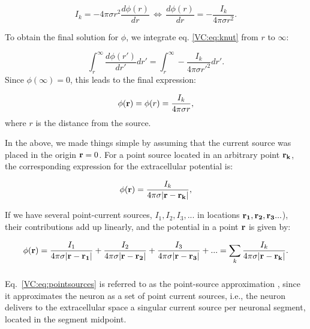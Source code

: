 \begin{equation}
I_k = -4\pi \sigma r^2  \frac{d\phi(r)}{dr} \, \iff \, \frac{d\phi(r)}{dr} = -\frac{I_k}{4\pi \sigma r^2 }.
\label{VC:eq:knut}
\end{equation}

To obtain the final solution for $\phi$, we integrate eq. \ref{VC:eq:knut} from $r$ to $\infty$:

\begin{equation}
\int_r^{\infty} \frac{d\phi(r')}{dr'} dr' = \int_r^{\infty} -\frac{I_k}{4\pi \sigma r'^2 } dr'.
\label{VC:eq:knut2}
\end{equation}
Since $\phi({\infty}) = 0$, this leads to the final expression:

\begin{equation}
\phi({\bf r}) = \phi(r) = \frac{I_k}{4\pi \sigma r},
\label{VC:eq:pointsource}
\end{equation}
where $r$ is the distance from the source.

In the above, we made things simple by assuming that the current source was placed in the origin ${\bf r} = 0$. For a point source located in an arbitrary point ${\bf r_k} $, the corresponding expression for the extracellular potential is:

\begin{equation}
\phi({\bf r}) = \frac{I_k}{4\pi \sigma |{\bf r-r_k}|},
\label{VC:eq:pointsource2}
\end{equation}

If we have several point-current sources, $I_{1}, I_2, I_3, ... $ in locations ${\bf r_1}, {\bf r_2}, {\bf r_3} ... $), their contributions add up linearly, and the potential in a point ${\bf r}$ is given by:

\begin{equation}
\phi({\bf r}) = \frac{I_1}{4\pi  \sigma {\bf |r-r_1|}} + \frac{I_2}{4\pi  \sigma {\bf |r-r_2|} } + \frac{I_3}{4\pi  \sigma {\bf |r-r_3|} } + ... = \sum_k \frac{I_k}{4\pi  \sigma {\bf |r-r_k|} }.
\label{VC:eq:pointsources}
\end{equation}


\subsubsection{}
Eq.~\ref{VC:eq:pointsources} is referred to as the point-source approximation \citep{Holt1999, Pettersen2008a}, since it approximates the neuron as a set of point current sources, i.e., the neuron delivers to the extracellular space a singular current source per neuronal segment, located in the segment midpoint. 

